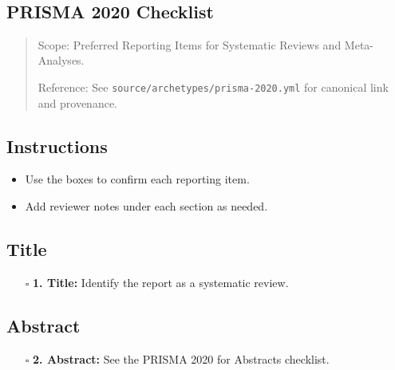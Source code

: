 \documentclass[11pt]{article}
\def\tightlist{}
\begin{document}
\begin{center}
{\LARGE }\\[4pt]
\normalsize 
\end{center}
\vspace{1em}

\begin{Form}

\section{PRISMA 2020 Checklist}\label{prisma-2020-checklist}

\begin{quote}
Scope: Preferred Reporting Items for Systematic Reviews and
Meta-Analyses.

Reference: See \texttt{source/archetypes/prisma-2020.yml} for canonical
link and provenance.
\end{quote}

\subsection{Instructions}\label{instructions}

\begin{itemize}
\tightlist
\item
  Use the boxes to confirm each reporting item.
\item
  Add reviewer notes under each section as needed.
\end{itemize}

\subsection{Title}\label{title}

\begin{itemize}
\tightlist
\item[$\square$]
  \textbf{1. Title:} Identify the report as a systematic review.
\end{itemize}

\subsection{Abstract}\label{abstract}

\begin{itemize}
\tightlist
\item[$\square$]
  \textbf{2. Abstract:} See the PRISMA 2020 for Abstracts checklist.
\end{itemize}


\end{Form}
\end{document}
